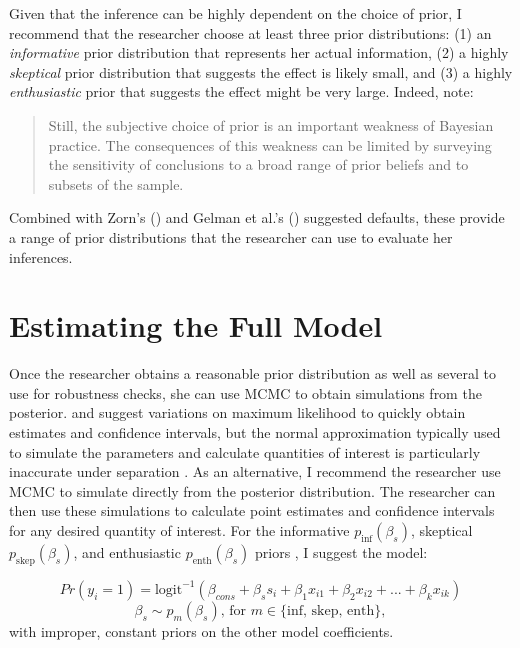 \documentclass[12pt]{article}
\begin{document}
Given that the inference can be highly dependent on the choice of prior, I recommend that the researcher choose at least three prior distributions: (1) an \emph{informative} prior distribution that represents her actual information, (2) a highly \emph{skeptical} prior distribution that suggests the effect is likely small, and (3) a highly \emph{enthusiastic} prior that suggests the effect might be very large. 
Indeed, \citet[p. 422]{WesternJackman1994} note: 
\begin{quote}
Still, the subjective choice of prior is an important weakness of Bayesian practice. The consequences of this weakness can be limited by surveying the sensitivity of conclusions to a broad range of prior beliefs and to subsets of the sample.
\end{quote}
Combined with Zorn's (\citeyear{Zorn2005}) and Gelman et al.'s (\citeyear{Gelmanetal2008}) suggested defaults, these provide a range of prior distributions that the researcher can use to evaluate her inferences.

\section*{Estimating the Full Model}

Once the researcher obtains a reasonable prior distribution as well as several to use for robustness checks, she can use MCMC \citep{Jackman2000} to obtain simulations from the posterior. 
\cite{Zorn2005} and \cite{Gelmanetal2008} suggest variations on maximum likelihood to quickly obtain estimates and confidence intervals, but the normal approximation typically used to simulate the parameters and calculate quantities of interest \citep{KingTomzWittenberg2000} is particularly inaccurate under separation \citep{HeinzeSchemper2002}. 
As an alternative, I recommend the researcher use MCMC to simulate directly from the posterior distribution. 
The researcher can then use these simulations to calculate point estimates and confidence intervals for any desired quantity of interest. 
For the informative $p_{\text{inf}}(\beta_s)$, skeptical $p_{\text{skep}}(\beta_s)$, and enthusiastic $p_{\text{enth}}(\beta_s)$ priors , I suggest the model:

\begin{equation*}
Pr(y_i =1) = \text{logit}^{-1}(\beta_{cons} + \beta_s s_i +  \beta_1 x_{i1} + \beta_2 x_{i2} + ... + \beta_k x_{ik})
\end{equation*}
\begin{equation*}
\beta_s \sim  p_m(\beta_s) \text{, for } m \in \{\text{inf, skep, enth}\},
\end{equation*}
with improper, constant priors on the other model coefficients.
\end{document}
